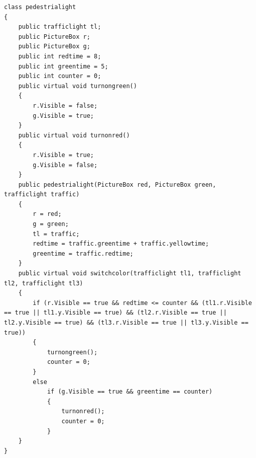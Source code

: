 \begin{lstlisting}[caption = Класс pedestrialight, label = {lst:pl}]
class pedestrialight
{
    public trafficlight tl;
    public PictureBox r;
    public PictureBox g;
    public int redtime = 8;
    public int greentime = 5;
    public int counter = 0;
    public virtual void turnongreen()
    {
        r.Visible = false;
        g.Visible = true;
    }
    public virtual void turnonred()
    {
        r.Visible = true;
        g.Visible = false;
    }
    public pedestrialight(PictureBox red, PictureBox green, trafficlight traffic)        
    {
        r = red;
        g = green;
        tl = traffic;
        redtime = traffic.greentime + traffic.yellowtime;
        greentime = traffic.redtime;
    }
    public virtual void switchcolor(trafficlight tl1, trafficlight tl2, trafficlight tl3)
    {
        if (r.Visible == true && redtime <= counter && (tl1.r.Visible == true || tl1.y.Visible == true) && (tl2.r.Visible == true || tl2.y.Visible == true) && (tl3.r.Visible == true || tl3.y.Visible == true))
        {
            turnongreen();
            counter = 0;
        }
        else
            if (g.Visible == true && greentime == counter)
            {
                turnonred();
                counter = 0;
            }
    }
}  
\end{lstlisting}

